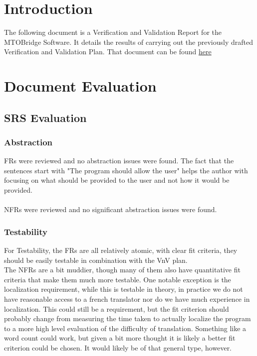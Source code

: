 \documentclass[12pt, titlepage]{article}
\begin{document}
\newpage

\tableofcontents

\listoftables %


\newpage


\section{Introduction}
The following document is a Verification and Validation Report for the MTOBridge Software. It details the results of carrying out the previously drafted
Verification and Validation Plan. That document can be found \href{https://github.com/agentvv/MTOBridge/blob/main/docs/VnVPlan/VnVPlan.pdf}{here}\\

\section{Document Evaluation}

\subsection{SRS Evaluation}
\subsubsection{Abstraction}
FRs were reviewed and no abstraction issues were found. The fact that the sentences start with "The program should allow the user" helps the author with focusing on what should be provided to the user and not how it would be provided.\\\\
NFRs were reviewed and no significant abstraction issues were found.

\subsubsection{Testability}

For Testability, the FRs are all relatively atomic, with clear fit criteria, they should be easily
testable in combination with the VnV plan.\\

The NFRs are a bit muddier, though many of them also have quantitative fit criteria that make them much more testable. One notable exception is the localization requirement,
while this is testable in theory, in practice we do not have reasonable access to a french translator nor do we have much experience in localization. This could still be a
requirement, but the fit criterion should probably change from measuring the time taken to actually localize the program to a more high level evaluation of the difficulty of
translation. Something like a word count could work, but given a bit more thought it is likely a better fit criterion could be chosen. It would likely be of that general type,
however.\\
\end{document}
